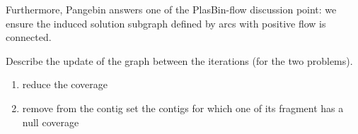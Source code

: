 Furthermore, Pangebin answers one of the PlasBin-flow discussion point: we ensure the induced solution subgraph defined by arcs with positive flow is connected.

\begin{todobox}
  Describe the update of the graph between the iterations (for the two problems).

  \begin{enumerate}
    \item reduce the coverage
    \item remove from the contig set the contigs for which one of its fragment has a null coverage
  \end{enumerate}
\end{todobox}









% 
